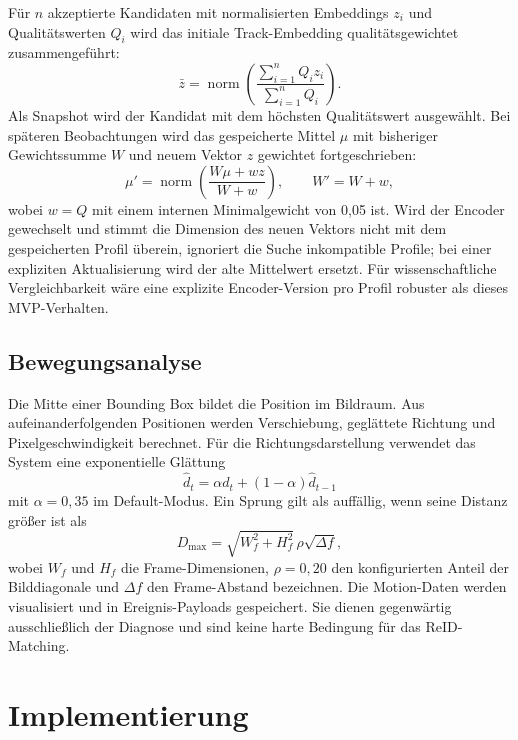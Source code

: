 \documentclass[runningheads]{llncs}
\begin{document}
Für $n$ akzeptierte Kandidaten mit normalisierten Embeddings $z_i$ und Qualitätswerten $Q_i$ wird das initiale Track-Embedding qualitätsgewichtet zusammengeführt:
\begin{equation}
\bar{z}=\operatorname{norm}\left(\frac{\sum_{i=1}^{n} Q_i z_i}{\sum_{i=1}^{n} Q_i}\right).
\label{eq:fusion}
\end{equation}
Als Snapshot wird der Kandidat mit dem höchsten Qualitätswert ausgewählt. Bei späteren Beobachtungen wird das gespeicherte Mittel $\mu$ mit bisheriger Gewichtssumme $W$ und neuem Vektor $z$ gewichtet fortgeschrieben:
\begin{equation}
\mu' = \operatorname{norm}\left(\frac{W\mu+wz}{W+w}\right), \qquad W'=W+w,
\label{eq:update}
\end{equation}
wobei $w=Q$ mit einem internen Minimalgewicht von 0,05 ist. Wird der Encoder gewechselt und stimmt die Dimension des neuen Vektors nicht mit dem gespeicherten Profil überein, ignoriert die Suche inkompatible Profile; bei einer expliziten Aktualisierung wird der alte Mittelwert ersetzt. Für wissenschaftliche Vergleichbarkeit wäre eine explizite Encoder-Version pro Profil robuster als dieses MVP-Verhalten.

\subsection{Bewegungsanalyse}

Die Mitte einer Bounding Box bildet die Position im Bildraum. Aus aufeinanderfolgenden Positionen werden Verschiebung, geglättete Richtung und Pixelgeschwindigkeit berechnet. Für die Richtungsdarstellung verwendet das System eine exponentielle Glättung
\begin{equation}
\hat{d}_t=\alpha d_t+(1-\alpha)\hat{d}_{t-1}
\label{eq:motion-smoothing}
\end{equation}
mit $\alpha=0{,}35$ im Default-Modus. Ein Sprung gilt als auffällig, wenn seine Distanz größer ist als
\begin{equation}
D_{\max}=\sqrt{W_f^2+H_f^2}\,\rho\sqrt{\Delta f},
\label{eq:jump}
\end{equation}
wobei $W_f$ und $H_f$ die Frame-Dimensionen, $\rho=0{,}20$ den konfigurierten Anteil der Bilddiagonale und $\Delta f$ den Frame-Abstand bezeichnen. Die Motion-Daten werden visualisiert und in Ereignis-Payloads gespeichert. Sie dienen gegenwärtig ausschließlich der Diagnose und sind keine harte Bedingung für das ReID-Matching.

\section{Implementierung}
\end{document}
